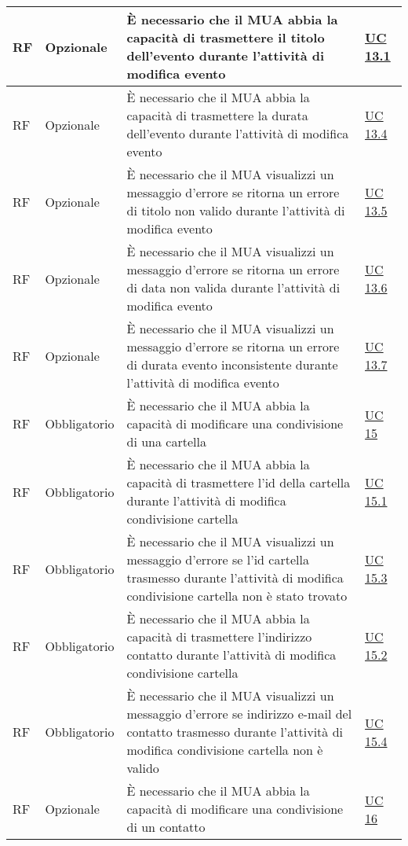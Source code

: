 \begin{longtable}{*{1}{>{\centering\arraybackslash}p{1.5cm}}*{1}{>{\centering\arraybackslash}p{2.5cm}}p{6cm}*{1}{>{\centering\arraybackslash}p{3cm}}}
    \\\hline
    RF & Opzionale & È necessario che il MUA abbia la capacità di trasmettere il titolo dell'evento durante l'attività di modifica evento & \hyperref[sec:UC13.1]{UC 13.1}
    \\\hline
    RF & Opzionale & È necessario che il MUA abbia la capacità di trasmettere la durata dell'evento durante l'attività di modifica evento & \hyperref[sec:UC13.4]{UC 13.4}
    \\\hline
    RF & Opzionale & È necessario che il MUA visualizzi un messaggio d'errore se ritorna un errore di titolo non valido durante l'attività di modifica evento & \hyperref[sec:UC13.5]{UC 13.5}
    \\\hline
    RF & Opzionale & È necessario che il MUA visualizzi un messaggio d'errore se ritorna un errore di data non valida durante l'attività di modifica evento & \hyperref[sec:UC13.6]{UC 13.6}
    \\\hline
    RF & Opzionale & È necessario che il MUA visualizzi un messaggio d'errore se ritorna un errore di durata evento inconsistente durante l'attività di modifica evento & \hyperref[sec:UC13.7]{UC 13.7}
    \\\hline
    RF & Obbligatorio & È necessario che il MUA abbia la capacità di modificare una condivisione di una cartella & \hyperref[sec:UC15]{UC 15}
    \\\hline
    RF & Obbligatorio & È necessario che il MUA abbia la capacità di trasmettere l'id della cartella durante l'attività di modifica condivisione cartella & \hyperref[sec:UC15.1]{UC 15.1}
    \\\hline
    RF & Obbligatorio & È necessario che il MUA visualizzi un messaggio d'errore se l'id cartella trasmesso durante l'attività di modifica condivisione cartella non è stato trovato & \hyperref[sec:UC15.3]{UC 15.3}
    \\\hline
    RF & Obbligatorio & È necessario che il MUA abbia la capacità di trasmettere l'indirizzo contatto durante l'attività di modifica condivisione cartella & \hyperref[sec:UC15.2]{UC 15.2}
    \\\hline
    RF & Obbligatorio & È necessario che il MUA visualizzi un messaggio d'errore se indirizzo e-mail del contatto trasmesso durante l'attività di modifica condivisione cartella non è valido & \hyperref[sec:UC15.4]{UC 15.4}
    \\\hline
    RF & Opzionale & È necessario che il MUA abbia la capacità di modificare una condivisione di un contatto & \hyperref[sec:UC16]{UC 16}
    \\\hline

\end{longtable}
